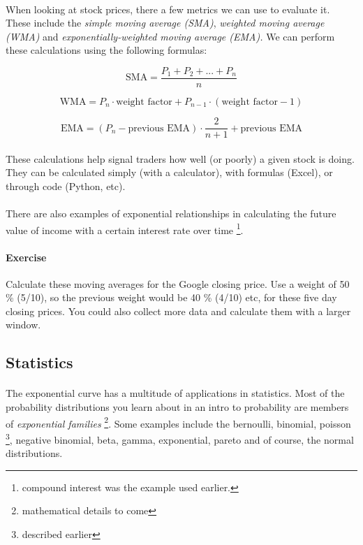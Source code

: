 \documentclass{cup-pan}
\begin{document}
\paragraph{}
When looking at stock prices, there a few metrics we can use to evaluate it. These include the \textit{simple moving average (SMA)}, \textit{weighted moving average (WMA)} and \textit{exponentially-weighted moving average (EMA).} We can perform these calculations using the following formulas:

$$\text{SMA} = \frac{P_1 + P_2 + ... + P_n}{n}$$

$$\text{WMA} = P_n \cdot \text{weight factor} + P_{n-1} \cdot (\text{weight factor} - 1)$$

$$\text{EMA} = (P_n - \text{previous EMA}) \cdot \frac{2}{n + 1} + \text{previous EMA}$$

\paragraph{}
These calculations help signal traders how well (or poorly) a given stock is doing. They can be calculated simply (with a calculator), with formulas (Excel), or through code (Python, etc).

\paragraph{} There are also examples of exponential relationships in calculating the future value of income with a certain interest rate over time \footnote{compound interest was the example used earlier.}.

\paragraph{Exercise} Calculate these moving averages for the Google closing price. Use a weight of 50 \% (5/10), so the previous weight would be 40 \% (4/10) etc, for these five day closing prices. You could also collect more data and calculate them with a larger window.


\subsection{Statistics}
\paragraph{} The exponential curve has a multitude of applications in statistics. Most of the probability distributions you learn about in an intro to probability are members of \textit{exponential families} \footnote{mathematical details to come}. Some examples include the bernoulli, binomial, poisson \footnote{described earlier}, negative binomial, beta, gamma, exponential, pareto and of course, the normal distributions.
\end{document}

